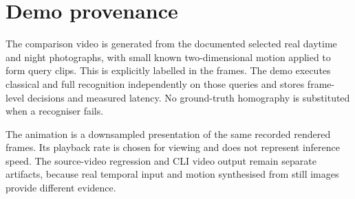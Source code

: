 \section{Demo provenance}
The comparison video is generated from the documented selected real daytime and night photographs, with small known two-dimensional motion applied to form query clips. This is explicitly labelled in the frames. The demo executes classical and full recognition independently on those queries and stores frame-level decisions and measured latency. No ground-truth homography is substituted when a recogniser fails.

The animation is a downsampled presentation of the same recorded rendered frames. Its playback rate is chosen for viewing and does not represent inference speed. The source-video regression and CLI video output remain separate artifacts, because real temporal input and motion synthesised from still images provide different evidence.
